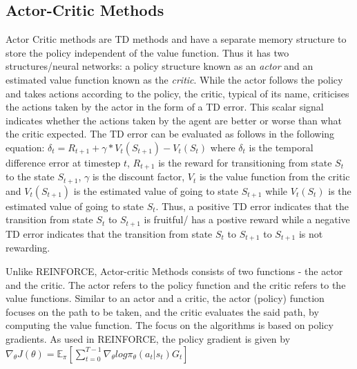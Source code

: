 \documentclass{article}
\begin{document}
\subsection{Actor-Critic Methods}
 Actor Critic methods are TD methods and have a separate memory structure to store the policy independent of the value function. Thus it has two  structures/neural networks: a policy structure known as an \emph{actor} and an estimated value function known as the \emph{critic}. While the actor follows the policy and takes actions according to the policy, the critic, typical of its name, criticises the actions taken by the actor in the form of a TD error. This scalar signal indicates whether the actions taken by the agent are better or worse than what the critic expected. The TD error can be evaluated as follows in the following equation: \newline
 $\delta_{t} = R_{t+1} + \gamma * V_t(S_{t+1})-V_t(S_t)$ \newline
 where $\delta_{t}$ is the temporal difference error at timestep $t$, $R_{t+1}$ is the reward for transitioning from state $S_t$ to the state $S_{t+1}$,  $\gamma$ is the discount factor, $V_{t}$ is the value function from the critic and $V_t(S_{t+1})$ is the estimated value of going to state $S_{t+1}$ while $V_t(S_t)$ is the estimated value of going to state $S_t$.  \newline 
 Thus, a positive TD error indicates that the transition from state $S_t$ to $S_{t+1}$ is fruitful/ has a postive reward while a negative TD error indicates that the transition from state  $S_t$ to $S_{t+1}$ to $S_{t+1}$ is not rewarding.
 \newline


Unlike REINFORCE, Actor-critic Methods consists of two functions - the actor and the critic. The actor refers to the policy function and the critic refers to the value functions. Similar to an actor and a critic, the actor (policy) function focuses on the path to be taken, and the critic evaluates the said path, by computing the value function. 
The focus on the algorithms is based on policy gradients. \cite{actor-critic}
\newline As used in REINFORCE, the policy gradient is given by 
\newline 
$\nabla_\theta J(\theta) = \mathbb{E}_\pi[\sum _{t=0}^{T-1} \nabla_\theta log\pi_\theta (a_t|s_t)G_t]$
\end{document}
